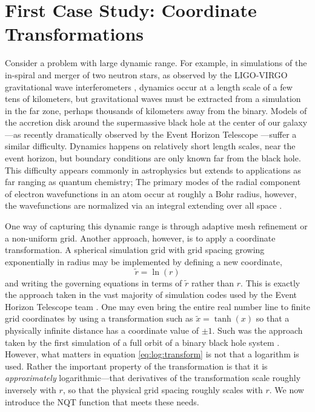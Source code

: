 \documentclass[a4paper,fleqn]{cas-sc}
\begin{document}
\section{First Case Study: Coordinate Transformations}
\label{sec:transformations}

Consider a problem with large dynamic range. For example, in
simulations of the in-spiral and merger of two neutron stars, as
observed by the LIGO-VIRGO gravitational wave interferometers
\citep{GW170817}, dynamics occur at a length scale of a few tens of
kilometers, but gravitational waves must be extracted from a
simulation in the far zone, perhaps thousands of kilometers away from
the binary. Models of the accretion disk around the supermassive black
hole at the center of our galaxy---as recently dramatically observed
by the Event Horizon Telescope \citep{EHTSagA}---suffer a similar
difficulty. Dynamics happens on relatively short length scales, near
the event horizon, but boundary conditions are only known far from the
black hole. This difficulty appears commonly in astrophysics but
extends to applications as far ranging as quantum chemistry; The
primary modes of the radial component of electron wavefunctions in an
atom occur at roughly a Bohr radius, however, the wavefunctions are
normalized via an integral extending over all space
\citep{grant2007relativistic}.

One way of capturing this dynamic range is through adaptive mesh
refinement \citep{BERGER1984484} or a non-uniform grid. Another
approach, however, is to apply a coordinate transformation. A
spherical simulation grid with grid spacing growing exponentially in
radius may be implemented by defining a new coordinate,
\begin{equation}
  \label{eq:log:transform}
  \tilde{r} = \ln(r)
\end{equation}
and writing the governing equations in terms of $\tilde{r}$ rather
than $r$. This is exactly the approach taken in the vast majority of
simulation codes used by the Event Horizon Telescope team
\citep{McKinney_2004}. One may even bring the entire real number line
to finite grid coordinates by using a transformation such as
$\tilde{x} = \tanh(x)$ so that a physically infinite distance has a
coordinate value of $\pm 1$. Such was the approach taken by the first
simulation of a full orbit of a binary black hole system
\citep{Pretorius}. However, what matters in equation
\eqref{eq:log:transform} is not that a logarithm is used. Rather the
important property of the transformation is that it is
\textit{approximately} logarithmic---that derivatives of the
transformation scale roughly inversely with $r$, so that the physical
grid spacing roughly scales with $r$. We now introduce the NQT
function that meets these needs.
\end{document}
